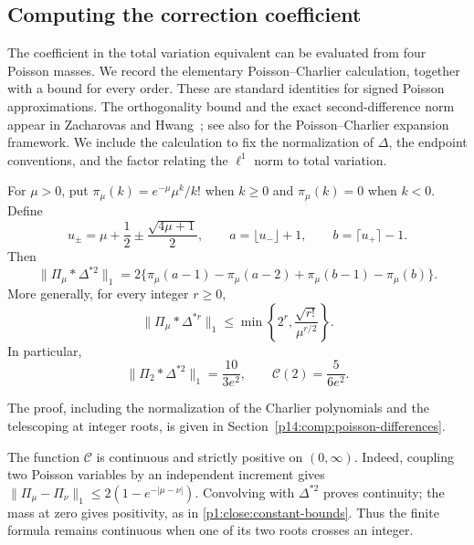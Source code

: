 \subsection{Computing the correction coefficient}
\label{p1:discussion:charlier}

The coefficient in the total variation equivalent can be
evaluated from four Poisson masses.  We record the elementary
Poisson--Charlier calculation, together with a bound for every
order. These are standard identities for signed Poisson
approximations. The orthogonality bound and the exact
second-difference norm appear in Zacharovas and
Hwang~\cite[(2.13), Remark~4.4]{zacharovashwang2010}; see also
\cite{bkn2014} for the Poisson--Charlier expansion framework.
We include the calculation to fix the normalization of
\(\Delta\), the endpoint conventions, and the factor relating
the \(\ell^1\) norm to total variation.

\begin{proposition}
\label{p1:discussion:charlier-norm}
For $\mu>0$, put $\pi_\mu(k)=e^{-\mu}\mu^k/k!$ when $k\ge0$
and $\pi_\mu(k)=0$ when $k<0$.  Define
\[
 u_\pm=\mu+\frac12\pm\frac{\sqrt{4\mu+1}}2,\qquad
 a=\lfloor u_-\rfloor+1,\qquad b=\lceil u_+\rceil-1.
\]
Then
\begin{equation}
 \|\Pi_\mu*\Delta^{*2}\|_1
 =2\bigl\{\pi_\mu(a-1)-\pi_\mu(a-2)
             +\pi_\mu(b-1)-\pi_\mu(b)\bigr\}.
 \label{p1:discussion:finite-norm}
\end{equation}
More generally, for every integer $r\ge0$,
\begin{equation}
 \|\Pi_\mu*\Delta^{*r}\|_1
       \le\min\left\{2^r,\frac{\sqrt{r!}}{\mu^{r/2}}\right\}.
 \label{p1:discussion:general-norm}
\end{equation}
In particular,
\begin{equation}
 \|\Pi_2*\Delta^{*2}\|_1=\frac{10}{3e^2},
 \qquad \mathcal C(2)=\frac{5}{6e^2}.
 \label{p1:discussion:lambda-two}
\end{equation}
\end{proposition}

The proof, including the normalization of the Charlier polynomials and
the telescoping at integer roots, is given in
Section~\ref{p14:comp:poisson-differences}.

The function $\mathcal C$ is continuous and strictly positive
on $(0,\infty)$.  Indeed, coupling two Poisson variables by
an independent increment gives
$\|\Pi_\mu-\Pi_\nu\|_1\le2(1-e^{-|\mu-\nu|})$.
Convolving with $\Delta^{*2}$ proves continuity; the mass
at zero gives positivity, as in
\eqref{p1:close:constant-bounds}.  Thus the finite formula
remains continuous when one of its two roots crosses an integer.

